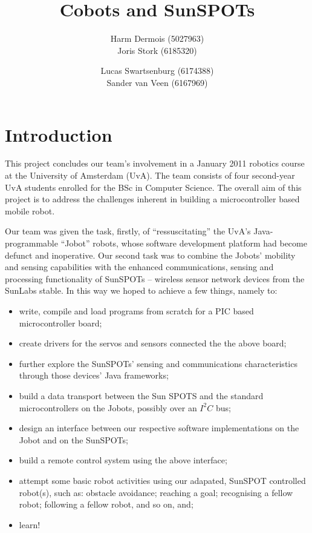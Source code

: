 \documentclass[a4paper,12pt]{article}
\author{Harm Dermois (5027963) \\ Joris Stork (6185320) \and
Lucas Swartsenburg (6174388) \\ Sander van Veen (6167969)}
\title{Cobots and SunSPOTs}
\begin{document}
\maketitle


\tableofcontents

\pagebreak

\section{Introduction}

This project concludes our team's involvement in a January 2011 robotics course
at the University of Amsterdam (UvA). The team consists of four second-year UvA
students enrolled for the BSc in Computer Science. The overall aim of this
project is to address the challenges inherent in building a microcontroller
based mobile robot.

Our team was given the task, firstly, of ``ressuscitating'' the UvA's
Java-programmable ``Jobot'' robots, whose software development platform had
become defunct and inoperative. Our second task was to combine the Jobots'
mobility and sensing capabilities with the enhanced communications, sensing and
processing functionality of SunSPOTs -- wireless sensor network devices from the
SunLabs stable. In this way we hoped to achieve a few things, namely to:

\begin{itemize}
    \item write, compile and load programs from scratch for a PIC based
    microcontroller board;
    \item create drivers for the servos and sensors connected the the above
    board;
    \item further explore the SunSPOTs' sensing and communications
    characteristics through those devices' Java frameworks;
    \item build a data transport between the Sun
    SPOTS and the standard microcontrollers on the Jobots, possibly over
    an $I^2C$ bus;
    \item design an interface between our respective software implementations
    on the Jobot and on the SunSPOTs;
    \item build a remote control system using the above interface;
    \item attempt some basic robot activities using our adapated, SunSPOT
    controlled robot(s), such as: obstacle avoidance; reaching a goal;
    recognising a fellow robot; following a fellow robot, and so on, and;
    \item learn!
\end{itemize}
\end{document}
